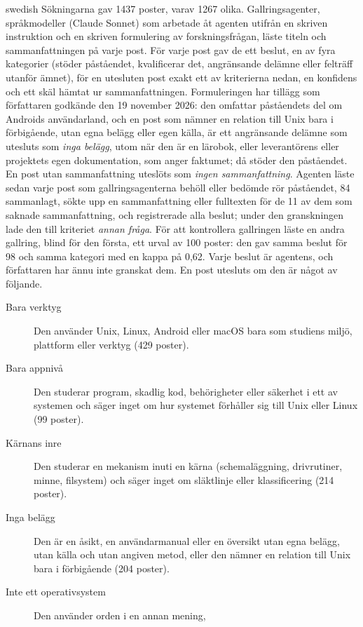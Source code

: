 \begin{onlyin}{swedish}
Sökningarna gav 1437 poster, varav 1267 olika.
Gallringsagenter, språkmodeller (Claude Sonnet) som arbetade åt agenten
utifrån en skriven instruktion och en skriven formulering av
forskningsfrågan, läste titeln och sammanfattningen på varje post.  För
varje post gav de ett beslut, en av fyra kategorier (stöder påståendet,
kvalificerar det, angränsande delämne eller felträff utanför ämnet), för
en utesluten post exakt ett av kriterierna nedan, en konfidens och ett
skäl hämtat ur sammanfattningen.  Formuleringen har tillägg som
författaren godkände den 19 november 2026: den omfattar påståendets del
om Androids användarland, och en post som nämner en relation till Unix
bara i förbigående, utan egna belägg eller egen källa, är ett
angränsande delämne som utesluts som \emph{inga belägg}, utom när den är
en lärobok, eller leverantörens eller projektets egen dokumentation, som
anger faktumet; då stöder den påståendet.  En post utan sammanfattning
uteslöts som \emph{ingen sammanfattning}.  Agenten läste sedan varje post
som gallringsagenterna behöll eller bedömde rör påståendet, 84
sammanlagt, sökte upp en sammanfattning eller fulltexten för de 11 av dem
som saknade sammanfattning, och registrerade alla beslut; under den
granskningen lade den till kriteriet \emph{annan fråga}.  För att
kontrollera gallringen läste en andra gallring, blind för den första,
ett urval av 100 poster: den gav samma beslut för 98 och samma kategori
med en kappa på 0,62.  Varje beslut är agentens, och författaren har
ännu inte granskat dem.  En post utesluts om den är något av följande.
\begin{description}
  \item[Bara verktyg] Den använder Unix, Linux, Android eller macOS bara
    som studiens miljö, plattform eller verktyg (429 poster).
  \item[Bara appnivå] Den studerar program, skadlig kod, behörigheter
    eller säkerhet i ett av systemen och säger inget om hur systemet
    förhåller sig till Unix eller Linux (99 poster).
  \item[Kärnans inre] Den studerar en mekanism inuti en kärna
    (schemaläggning, drivrutiner, minne, filsystem) och säger inget om
    släktlinje eller klassificering (214 poster).
  \item[Inga belägg] Den är en åsikt, en användarmanual eller en
    översikt utan egna belägg, utan källa och utan angiven metod, eller
    den nämner en relation till Unix bara i förbigående (204 poster).
  \item[Inte ett operativsystem] Den använder orden i en annan mening,

\end{description}
\end{onlyin}
